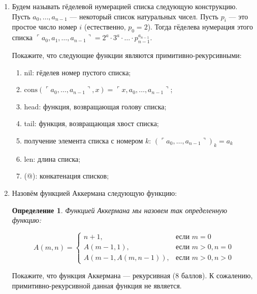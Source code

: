\documentclass[10pt,a4paper,oneside]{article}
\newtheorem{definition}{Определение}
\begin{document}
\begin{enumerate}
\item Будем называть гёделевой нумерацией списка следующую конструкцию. Пусть $a_0, \dots, a_{n-1}$ --- некоторый
список натуральных чисел. Пусть $p_i$ --- это простое число номер $i$ (естественно, $p_0 = 2$).
Тогда гёделева нумерация этого списка $\ulcorner a_0, a_1, \dots, a_{n-1} \urcorner = 2^a \cdot 3^a \cdot \dots \cdot p_{n-1}^{a_{n-1}}$.

Покажите, что следующие функции являются примитивно-рекурсивными:

\begin{enumerate}
\item nil: гёделев номер пустого списка;
\item $\textrm{cons}(\ulcorner a_0,\dots,a_{n-1}\urcorner,x) = \ulcorner x,a_0,\dots,a_{n-1}\urcorner$;
\item head: функция, возвращающая голову списка;
\item tail: функция, возвращающая хвост списка;
\item получение элемента списка с номером $k$: $(\ulcorner a_0, \dots, a_{n-1} \urcorner)_k = a_k$
\item len: длина списка;
\item (@): конкатенация списков;
\end{enumerate}

\item Назовём функцией Аккермана следующую функцию:

\begin{definition}Функцией \emph{Аккермана} мы назовем так определенную 
функцию:

$$A(m,n) = \left\{\begin{array}{rl}
   n+1, & \mbox{если $m = 0$}\\
   A(m-1,1), & \mbox{если $m > 0, n = 0$}\\
   A(m-1,A(m,n-1)), & \mbox{если $m > 0, n > 0$}
\end{array}\right.$$
\end{definition}

Покажите, что функция Аккермана --- рекурсивная (8 баллов).
К сожалению, примитивно-рекурсивной данная функция не является.
\end{enumerate}
\end{document}
